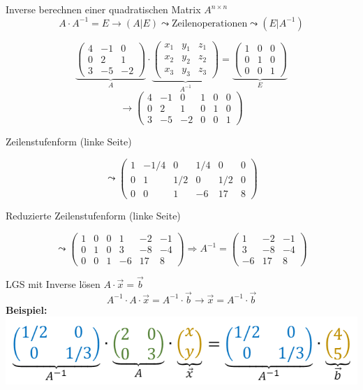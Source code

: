 \begin{KR}{Inverse berechnen} einer quadratischen Matrix $A^{n \times n}$
    $$A \cdot A^{-1} = E \rightarrow \left( A | E \right) \leadsto \text{Zeilenoperationen} \leadsto \left( E | A^{-1}\right)$$
\end{KR}

\begin{example}
    $$
\underbrace{\left(\begin{array}{ccc}
4 & -1 & 0 \\
0 & 2 & 1 \\
3 & -5 & -2
\end{array}\right)}_{A} \cdot \underbrace{\left(\begin{array}{lll}
x_{1} & y_{1} & z_{1} \\
x_{2} & y_{2} & z_{2} \\
x_{3} & y_{3} & z_{3}
\end{array}\right)}_{A^{-1}}=\underbrace{\left(\begin{array}{lll}
1 & 0 & 0 \\
0 & 1 & 0 \\
0 & 0 & 1
\end{array}\right)}_{E}$$
$$ \rightarrow\left(\begin{array}{ccc|ccc}
4 & -1 & 0 & 1 & 0 & 0 \\
0 & 2 & 1 & 0 & 1 & 0 \\
3 & -5 & -2 & 0 & 0 & 1
\end{array}\right)
$$

Zeilenstufenform (linke Seite)

$$ \leadsto 
\left(\begin{array}{ccc|ccc}
1 & -1 / 4 & 0 & 1 / 4 & 0 & 0 \\
0 & 1 & 1 / 2 & 0 & 1 / 2 & 0 \\
0 & 0 & 1 & -6 & 17 & 8
\end{array}\right)
$$

Reduzierte Zeilenstufenform (linke Seite)

$$ \leadsto 
\left(\begin{array}{ccc|ccc}
1 & 0 & 0 & 1 & -2 & -1 \\
0 & 1 & 0 & 3 & -8 & -4 \\
0 & 0 & 1 & -6 & 17 & 8
\end{array}\right) \Rightarrow A^{-1}=\left(\begin{array}{ccc}
1 & -2 & -1 \\
3 & -8 & -4 \\
-6 & 17 & 8
\end{array}\right)
$$
\end{example}



\begin{concept}{LGS mit Inverse lösen}
    $A \cdot \vec{x} = \vec{b}$
    $$A^{-1} \cdot A \cdot \vec{x} = A^{-1} \cdot \vec{b} \rightarrow \vec{x} = A^{-1} \cdot \vec{b}$$
    \textbf{Beispiel:}\\
    \includegraphics[width=0.5\linewidth]{lgs_inverse.png}
\end{concept}



